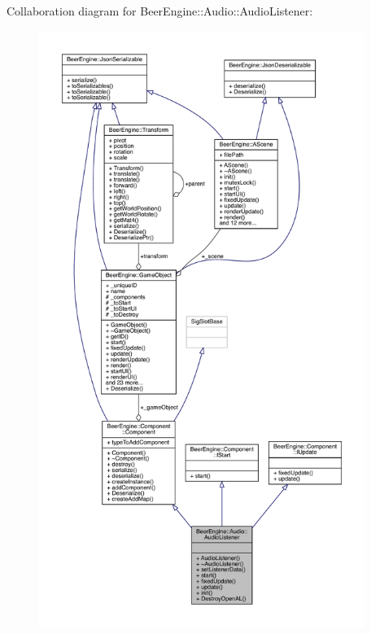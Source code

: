 Collaboration diagram for Beer\+Engine\+:\+:Audio\+:\+:Audio\+Listener\+:\nopagebreak
\begin{figure}[H]
\begin{center}
\leavevmode
\includegraphics[height=550pt]{class_beer_engine_1_1_audio_1_1_audio_listener__coll__graph}
\end{center}
\end{figure}
